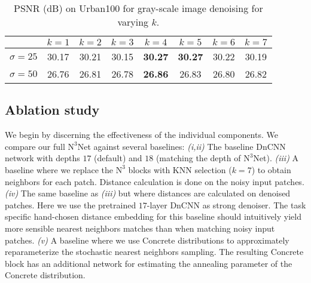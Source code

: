 \documentclass{article}
\newcommand\kk{k}
\newcommand\nnn{\text{N}^3}
\begin{document}
\begin{table}[b]
	\vspace{-0.5em}
	\caption{PSNR (dB) on Urban100 for gray-scale image denoising for varying $\kk$.}
	\label{tab:k_exp}
	\footnotesize
	\centering
	\smallskip
	\begin{tabularx}{\linewidth}{@{} X S[table-format=2.2] @{\hspace{1cm}} S[table-format=2.2] @{\hspace{1cm}} S[table-format=2.2] @{\hspace{1cm}} S[table-format=2.2] @{\hspace{1cm}} S[table-format=2.2] @{\hspace{1cm}} S[table-format=2.2] @{\hspace{1cm}} S[table-format=2.2]@{}}
		\toprule
					&{$\kk=1$}	& {$\kk=2$}	& {$\kk=3$} 	& {$\kk=4$}	&  {$\kk=5$} 	& {$\kk=6$} 	&  {$\kk=7$}	\\
		\midrule
		$\sigma=25$ & 30.17 	& 30.21 	& 30.15		& \bfseries 30.27		& \bfseries 30.27		& 30.22		& 30.19  \\
		$\sigma=50$ & 26.76		& 26.81 	& 26.78		& \bfseries 26.86		& 26.83		& 26.80		& 26.82  \\
		\bottomrule
	\end{tabularx}
																\end{table}


\subsection{Ablation study}
\label{sec:experiments_ablation}
We begin by discerning the effectiveness of the individual components.
We compare our full $\nnn$Net against several baselines: 
\emph{(i,ii)} The baseline DnCNN network with depths $17$ (default) and $18$ (matching the depth of $\nnn$Net). 
\emph{(iii)} A baseline where we replace the $\nnn$ blocks with KNN selection ($\kk=7$) to obtain neighbors for each patch.
Distance calculation is done on the noisy input patches.
\emph{(iv)} The same baseline as \emph{(iii)} but where distances are calculated on denoised patches.
Here we use the pretrained $17$-layer DnCNN as strong denoiser. 
The task specific hand-chosen distance embedding for this baseline should intuitively yield more sensible nearest neighbors matches than when matching noisy input patches.
\emph{(v)} A baseline where we use Concrete distributions \cite{Jang:2016:CRW,Maddison:2016:TCD} to approximately reparameterize the stochastic nearest neighbors sampling. 
The resulting Concrete block has an additional network for estimating the annealing parameter of the Concrete distribution.
\end{document}
